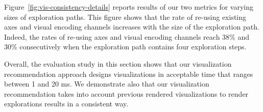 Figure~\ref{fig:vis-consistency-details} reports results of our two metrics for varying sizes of exploration paths. This figure shows that the rate of re-using existing axes and visual encoding channels increases with the size of the exploration path. Indeed, the rates of re-using axes and visual encoding channels reach 38\% and 30\% consecutively when the exploration path contains four exploration steps.




Overall, the evaluation study in this section shows that our visualization recommendation approach designs visualizations  in acceptable time that ranges between 1 and 20 ms.  We demonstrate also that our visualization recommendation takes into account previous rendered visualizations to render explorations results in a consistent way.






